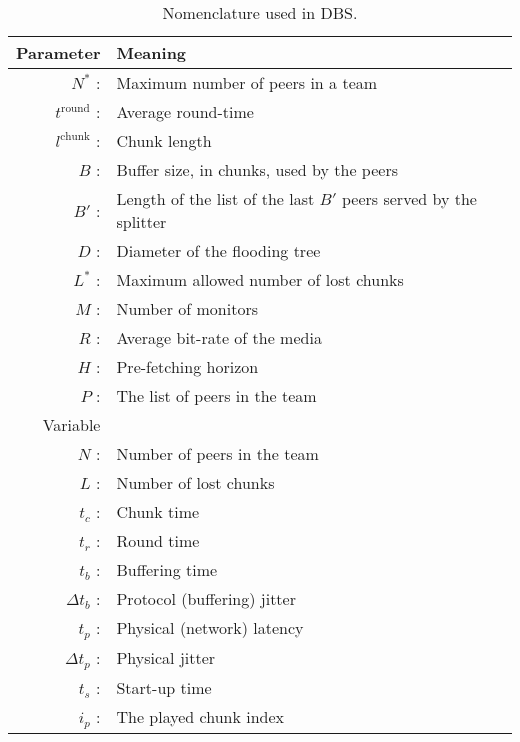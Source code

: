 \begin{table}[t]
  \centering
  \begin{tabular}{rl}
    Parameter & Meaning \\
    \hline
    $N^*$ :  & Maximum number of peers in a team \\
    $t^{\mathrm{round}}$ :    & Average round-time \\
    $l^{\mathrm{chunk}}$ : & Chunk length \\
    $B$ :    & Buffer size, in chunks, used by the peers \\
    $B'$ :   & Length of the list of the last $B'$ peers served by the splitter \\ 
    $D$ :    & Diameter of the flooding tree \\
    $L^*$ :  & Maximum allowed number of lost chunks \\
    $M$ :    & Number of monitors \\
    $R$ :    & Average bit-rate of the media \\
    $H$ :    & Pre-fetching horizon \\
    $P$ :    & The list of peers in the team \\
    Variable & \\
    \hline
    $N$ :    & Number of peers in the team \\
    $L$ :    & Number of lost chunks \\
    $t_c$ :  & Chunk time \\
    $t_r$ :  & Round time \\
    $t_b$ :  & Buffering time \\
    $\Delta t_b$ : & Protocol (buffering) jitter \\ 
    $t_p$ :  & Physical (network) latency \\
    $\Delta t_p$ : & Physical jitter \\
    $t_s$ :  & Start-up time \\
    $i_p$ :  & The played chunk index 
  \end{tabular}
  \caption{Nomenclature used in DBS.} %
  \label{tab:DBS_nomenclature}
\end{table}
